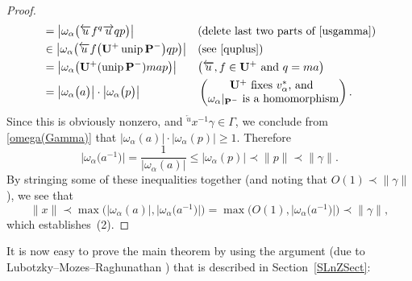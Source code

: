 \documentclass[11pt]{article}
\numberwithin{equation}{section}
\newcommand{\Pa}{\mathbf{P}}
\newcommand{\Ua}{\mathbf{U}}
\DeclareMathOperator{\unip}{unip}
\numberwithin{equation}{section}
\theoremstyle{definition}
\begin{document}
\begin{proof}
\begin{align*}
	&= \bigl| \omega_\alpha \bigl( \overleftarrow{u} f {}^q \overrightarrow{u} q p \bigr) \bigr|
		&& \text{(delete last two parts of \eqref{usgamma})}
	\\&\in \bigl| \omega_\alpha \bigl( \overleftarrow{u} f \big(\Ua^+ \unip \Pa^-\big) q p \bigr) \bigr|
		&& \text{(see \eqref{quplus})}
	\\&= \bigl| \omega_\alpha \bigl( \Ua^+ (\unip \Pa^-) m a p \bigr) \bigr|
		&& \text{\big($\overleftarrow{u},f \in \Ua^+$ and $q = ma$\big)}
	\\&= \bigl| \omega_\alpha \bigl( a \bigr) \bigr| \cdot \bigl| \omega_\alpha \bigl( p \bigr) \bigr|
		&& \begin{pmatrix} \text{$\Ua^+$ fixes $v_\alpha^*$, and } \\
		\text{$\omega_\alpha|_{\Pa^-}$ is a homomorphism} \end{pmatrix}.
	\end{align*}
Since this is obviously nonzero, and ${}^{\overleftarrow{u}} \! \! x^{-1} \gamma \in \Gamma$, we conclude from \eqref{omega(Gamma)} that $ |\omega_\alpha ( a ) | \cdot |\omega_\alpha ( p ) | \ge 1$. Therefore
	\[ \big|\omega_\alpha\big(a^{-1}\big)\big|
	= \frac{1}{|\omega_\alpha(a)|}
	\le |\omega_\alpha ( p ) |
	\prec \| p\|
	\prec \| \gamma\| .\]
By stringing some of these inequalities together (and noting that $O(1) \prec \| \gamma\|$), we see that
	\[ \| x\|
	 \prec \max \bigl( |\omega_\alpha(a)|, \big|\omega_\alpha\big(a^{-1}\big)\big| \bigr)
	 = \max \bigl( O(1), \big|\omega_\alpha\big(a^{-1}\big)\big| \bigr)
	 \prec \| \gamma\|
	 , \]
which establishes~(2).
\end{proof}

It is now easy to prove the main theorem by using the argument (due to Lubotzky--Mozes--Raghunathan \cite[Section~4]{MR1828742}) that is described in Section~\ref{SLnZSect}:
\end{document}
